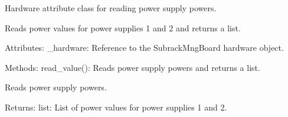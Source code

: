 \documentclass[letterpaper,10pt,english]{sphinxmanual}
\begin{document}
\begin{fulllineitems}
\label{\detokenize{webserverdocs:subrack_hardware.PSPower}}
\pysigstartsignatures
{}
\pysigstopsignatures
\sphinxAtStartPar
Hardware attribute class for reading power supply powers.

\sphinxAtStartPar
Reads power values for power supplies 1 and 2 and returns a list.

\sphinxAtStartPar
Attributes:
\sphinxhyphen{} \_hardware: Reference to the SubrackMngBoard hardware object.

\sphinxAtStartPar
Methods:
\sphinxhyphen{} read\_value(): Reads power supply powers and returns a list.

\begin{fulllineitems}
\label{\detokenize{webserverdocs:subrack_hardware.PSPower.read_value}}
\pysigstartsignatures
{}
\pysigstopsignatures
\sphinxAtStartPar
Reads power supply powers.

\sphinxAtStartPar
Returns:
list: List of power values for power supplies 1 and 2.

\end{fulllineitems}


\end{fulllineitems}

\end{document}
